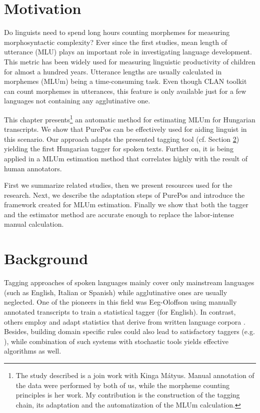
\section{Motivation}

Do linguists need to spend long hours counting morphemes for measuring morphosyntactic complexity? 
Ever since the first studies, mean length of utterance (MLU) plays an important role in investigating language development. 
This metric has been widely used for measuring linguistic productivity of children for almost a hundred years. Utterance lengths are usually calculated in morphemes  (MLUm) being a time-consuming task. Even though CLAN toolkit can count morphemes in utterances, this feature is only available just for a few languages not containing any agglutinative one.

This chapter presents\footnote{The study described is a join work with Kinga Mátyus. Manual annotation of the data were performed by both of us, while the morpheme counting principles is her work. My contribution is the construction of the tagging chain, its adaptation and the automatization of the MLUm calculation.} 
an automatic method for estimating MLUm for Hungarian transcripts. We show that PurePos can be effectively used for aiding linguist in this scenario. Our approach adapts the presented tagging tool (cf. Section \ref{}) yielding the first Hungarian tagger for spoken texts. Further on, it is being applied in a MLUm estimation method that correlates highly with the result of human annotators. 

First we summarize related studies, then we present resources used for the research. Next, we describe the adaptation steps of PurePos and introduce the framework created for MLUm estimation. Finally we show that both the tagger and the estimator method are accurate enough to replace the labor-intense manual calculation.

\section{Background}

Tagging approaches of spoken languages mainly cover only mainstream languages (such as English, Italian or Spanish) while agglutinative ones are usually neglected. 
One of the pioneers in this field was Eeg-Oloffson \cite{Svartvik1982} using  manually annotated transcripts to train a statistical tagger (for English). In contrast, others employ and adapt statistics that derive from written language corpora \cite{Mendes2004,Nivre1996,Panunzi2004}.
Besides, building domain specific rules could also lead to satisfactory taggers (e.g. \cite{Moreno2003}),
while combination of such systems with stochastic tools \cite{Bick2012} yields effective algorithms as well. 

